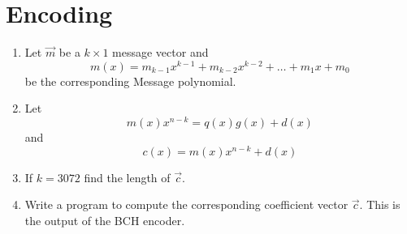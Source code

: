 \documentclass[journal,12pt,twocolumn]{IEEEtran}
\renewcommand\thesection{\arabic{section}}
\begin{document}
\section{Encoding}
\begin{enumerate}[label=\thesection.\arabic*
,ref=\thesection.\theenumi]
\item Let $\vec{m}$ be a $k \times 1$ message vector and  
\begin{equation}
m(x)=m_{k-1}x^{k-1}+m_{k-2}x^{k-2}+\dots+m_1x+m_0
\end{equation} 
be the  corresponding Message polynomial. 
\item Let 
\begin{equation}
m(x)x^{n-k} = q(x)g(x)+d(x)
\end{equation} 
and 
\begin{equation}
c(x)=m(x)x^{n-k}+d(x)
\end{equation}
%
\item If $k = 3072$ find the length of $\vec{c}$.
\item 
Write a program to compute the corresponding coefficient vector $\vec{c}$. This is the output of the BCH 
encoder.
\\
\solution
\end{enumerate}
\end{document}
